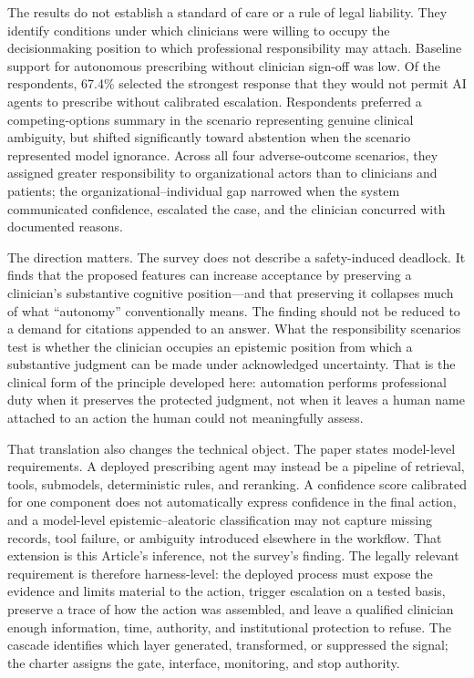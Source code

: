 The results do not establish a standard of care or a rule of legal liability. They identify conditions under which clinicians were willing to occupy the decisionmaking position to which professional responsibility may attach. Baseline support for autonomous prescribing without clinician sign-off was low. Of the respondents, 67.4\% selected the strongest response that they would not permit AI agents to prescribe without calibrated escalation. Respondents preferred a competing-options summary in the scenario representing genuine clinical ambiguity, but shifted significantly toward abstention when the scenario represented model ignorance. Across all four adverse-outcome scenarios, they assigned greater responsibility to organizational actors than to clinicians and patients; the organizational--individual gap narrowed when the system communicated confidence, escalated the case, and the clinician concurred with documented reasons.

The direction matters. The survey does not describe a safety-induced deadlock. It finds that the proposed features can increase acceptance by preserving a clinician's substantive cognitive position---and that preserving it collapses much of what ``autonomy'' conventionally means. The finding should not be reduced to a demand for citations appended to an answer. What the responsibility scenarios test is whether the clinician occupies an epistemic position from which a substantive judgment can be made under acknowledged uncertainty. That is the clinical form of the principle developed here: automation performs professional duty when it preserves the protected judgment, not when it leaves a human name attached to an action the human could not meaningfully assess.

That translation also changes the technical object. The paper states model-level requirements. A deployed prescribing agent may instead be a pipeline of retrieval, tools, submodels, deterministic rules, and reranking. A confidence score calibrated for one component does not automatically express confidence in the final action, and a model-level epistemic--aleatoric classification may not capture missing records, tool failure, or ambiguity introduced elsewhere in the workflow. That extension is this Article's inference, not the survey's finding. The legally relevant requirement is therefore harness-level: the deployed process must expose the evidence and limits material to the action, trigger escalation on a tested basis, preserve a trace of how the action was assembled, and leave a qualified clinician enough information, time, authority, and institutional protection to refuse. The cascade identifies which layer generated, transformed, or suppressed the signal; the charter assigns the gate, interface, monitoring, and stop authority.

